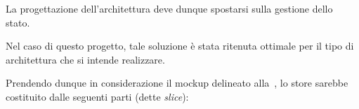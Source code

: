       La progettazione dell'architettura deve dunque spostarsi sulla gestione dello stato.







    
      Nel caso di questo progetto, tale soluzione è stata ritenuta ottimale per il tipo di architettura che si intende realizzare.


      Prendendo dunque in considerazione il mockup delineato alla~, lo store sarebbe costituito dalle seguenti parti (dette \emph{slice}):

